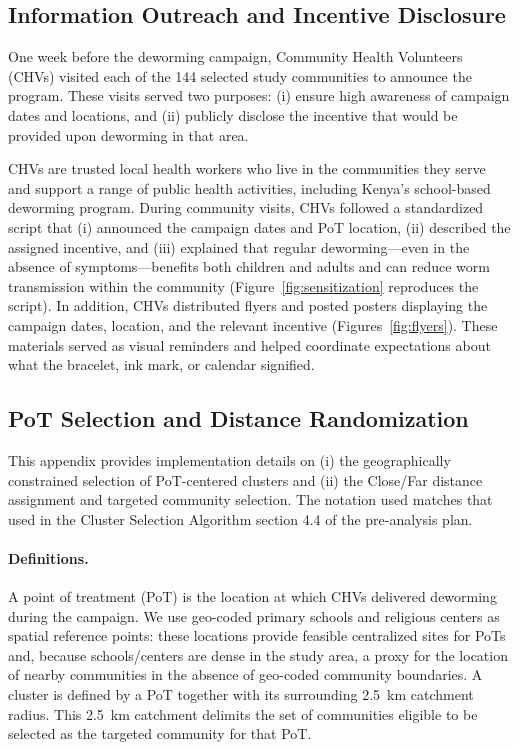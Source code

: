 \subsection{Information Outreach and Incentive Disclosure}\label{sec:info-campaign} 

One week before the deworming campaign, Community Health Volunteers (CHVs) visited each of the 144 selected study communities to announce the program. These visits served two purposes: (i) ensure high awareness of campaign dates and locations, and (ii) publicly disclose the incentive that would be provided upon deworming in that area.

CHVs are trusted local health workers who live in the communities they serve and support a range of public health activities, including Kenya’s school-based deworming program. During community visits, CHVs followed a standardized script that (i) announced the campaign dates and PoT location, (ii) described the assigned incentive, and (iii) explained that regular deworming---even in the absence of symptoms---benefits both children and adults and can reduce worm transmission within the community (Figure~\ref{fig:sensitization} reproduces the script). In addition, CHVs distributed flyers and posted posters displaying the campaign dates, location, and the relevant incentive (Figures~\ref{fig:flyers}). These materials 
served as visual reminders and helped coordinate expectations about what the bracelet, ink mark, or calendar signified.




\subsection{PoT Selection and Distance Randomization}\label{sec:site-selection}

This appendix provides implementation details on (i) the geographically constrained selection of PoT-centered clusters
and (ii) the Close/Far distance assignment and targeted community selection. The notation used matches that used in the Cluster Selection Algorithm section 4.4 of the pre-analysis plan.

\paragraph{Definitions.}
A point of treatment (PoT) is the location at which CHVs delivered deworming during the campaign.
We use geo-coded primary schools and religious centers as spatial reference points: these locations provide feasible centralized sites for PoTs
and, because schools/centers are dense in the study area, a proxy for the location of nearby communities in the absence of geo-coded community boundaries. A cluster is defined by a PoT together with its surrounding 2.5~km catchment radius. This 2.5~km catchment delimits the set of communities eligible to be selected as the targeted community for that PoT.

